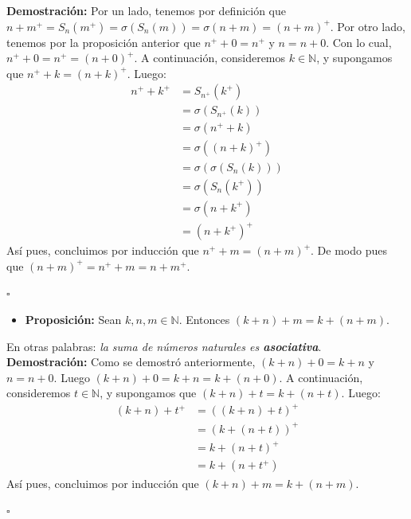 \documentclass[10 pt]{article}
\begin{document}
\Large{\textbf{Demostración:} Por un lado, tenemos por definición que $n+m^+=S_n(m^+)=\sigma(S_n(m))=\sigma(n+m)=(n+m)^+$. Por otro lado, tenemos por la proposición anterior que $n^++0=n^+$ y $n=n+0$. Con lo cual, $n^++0=n^+=(n+0)^+$. A continuación, consideremos $k \in \mathbb N$, y supongamos que $n^++k=(n+k)^+$. Luego:}
\begin{align*}
    n^++k^+&=S_{n^+}(k^+) \\
    &=\sigma(S_{n^+}(k)) \\
    &=\sigma(n^++k) \\
    &=\sigma((n+k)^+) \\
    &=\sigma(\sigma(S_n(k))) \\
    &=\sigma(S_n(k^+)) \\
    &=\sigma(n+k^+) \\
    &=(n+k^+)^+
\end{align*}
\Large{Así pues, concluimos por inducción que $n^++m=(n+m)^+$. De modo pues que $(n+m)^+=n^++m=n+m^+$.} \\

\begin{flushright}
    $\square$
\end{flushright}

\begin{itemize}
    \item \Large{\textbf{Proposición:} Sean $k,n,m \in \mathbb N$. Entonces $(k+n)+m=k+(n+m)$.} \\
\end{itemize}

\Large{En otras palabras: \textit{la suma de números naturales es \textbf{asociativa}}.} \\

\Large{\textbf{Demostración:} Como se demostró anteriormente, $(k+n)+0=k+n$ y $n=n+0$. Luego $(k+n)+0=k+n=k+(n+0)$. A continuación, consideremos $t \in \mathbb N$, y supongamos que $(k+n)+t=k+(n+t)$. Luego:}
\begin{align*}
    (k+n)+t^+&=((k+n)+t)^+ \\
    &=(k+(n+t))^+ \\
    &=k+(n+t)^+ \\
    &=k+(n+t^+)
\end{align*}
\Large{Así pues, concluimos por inducción que $(k+n)+m=k+(n+m)$.} \\

\begin{flushright}
    $\square$
\end{flushright}
\end{document}
